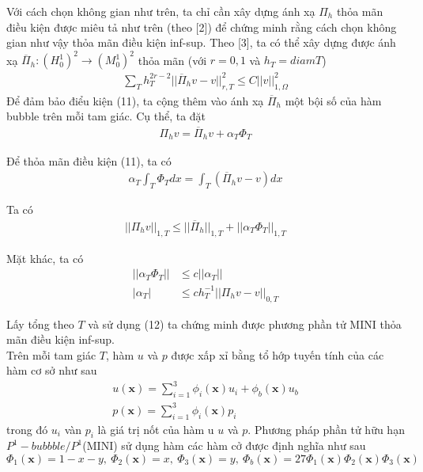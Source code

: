 \documentclass[14pt]{extreport}
\begin{document}
{Với cách chọn không gian như trên, ta chỉ cần xây dựng ánh xạ $\Pi_h$ thỏa mãn điều kiện được miêu tả như trên (theo [2]) để chứng minh rằng cách chọn không gian như vậy thỏa mãn điều kiện inf-sup. Theo [3], ta có thể xây dựng được ánh xạ $\overline{\Pi}_h: (H_0^1)^2 \rightarrow (M_0^1)^2$ thỏa mãn (với $r = 0,1$ và $h_T = diam T$)
\begin{equation} \label{eq12}
\begin{split}
\sum_T h_T^{2r-2} ||\overline{\Pi}_hv - v||_{r, T}^2 \leq C ||v||_{1, \Omega}^2
\end{split}
\end{equation}
Để đảm bảo điểu kiện (11), ta cộng thêm vào ánh xạ $\overline{\Pi}_h$ một bội số của hàm bubble trên mỗi tam giác. Cụ thể, ta đặt
\begin{equation} \label{eq13}
\begin{split}
\Pi_hv = \overline{\Pi}_hv + \alpha_T \Phi_T
\end{split}
\end{equation}

Để thỏa mãn điều kiện (11), ta có
\begin{equation} \label{eq14}
\begin{split}
\alpha_T \int_T \Phi_T dx = \int_T (\overline{\Pi}_hv - v)dx
\end{split}
\end{equation}

Ta có
\begin{equation} \label{eq15}
\begin{split}
||\Pi_hv||_{1, T} \leq ||\overline{\Pi}_h||_{1, T} + ||\alpha_T \Phi_T||_{1, T}
\end{split}
\end{equation}

Mặt khác, ta có
\begin{equation} \label{eq16}
\begin{split}
||\alpha_T \Phi_T|| & \leq c ||\alpha_T||\\
|\alpha_T| & \leq ch_T^{-1} ||\Pi_hv - v||_{0, T}
\end{split}
\end{equation}

Lấy tổng theo $T$ và sử dụng (12) ta chứng minh được phương phần tử MINI thỏa mãn điều kiện inf-sup. \\
Trên mỗi tam giác $T$, hàm $u$ và $p$ được xấp xỉ bằng tổ hớp tuyến tính của các hàm cơ sở như sau
\begin{equation} \label{eq17}
\begin{split}
u(\mathbf{x}) = \sum_{i=1}^3 \phi_i(\mathbf{x}) u_i + \phi_b(\mathbf{x}) u_b \\
p(\mathbf{x}) = \sum_{i=1}^3 \phi_i(\mathbf{x})p_i
\end{split}
\end{equation}
trong đó $u_i$ vàn $p_i$ là giá trị nốt của hàm u $u$ và $p$. Phương pháp phần tử hữu hạn $P^1-bubbble / P^1$(MINI) sử dụng hàm các hàm cở được định nghĩa như sau
$$\Phi_1(\mathbf{x}) = 1 - x-y, \ \Phi_2(\mathbf{x}) = x, \ \Phi_3(\mathbf{x}) = y, \ \Phi_b(\mathbf{x}) = 27 \Phi_1(\mathbf{x})\Phi_2(\mathbf{x})\Phi_3(\mathbf{x})$$

}
\end{document}
